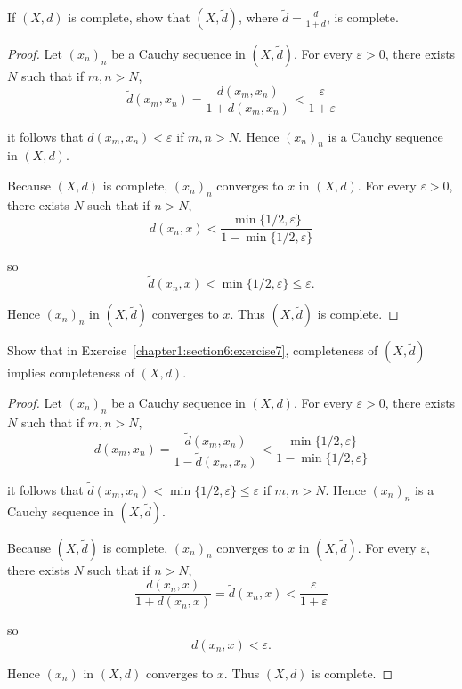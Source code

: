\begin{exercise}\label{chapter1:section6:exercise7}
    If $(X, d)$ is complete, show that $(X, \widetilde{d})$, where $\widetilde{d} = \frac{d}{1 + d}$, is complete.
\end{exercise}

\begin{proof}
    Let ${(x_{n})}_{n}$ be a Cauchy sequence in $(X, \widetilde{d})$. For every $\varepsilon > 0$, there exists $N$ such that if $m, n > N$,
    \[
        \widetilde{d}(x_{m}, x_{n}) = \frac{d(x_{m}, x_{n})}{1 + d(x_{m}, x_{n})} < \frac{\varepsilon}{1 + \varepsilon}
    \]

    it follows that $d(x_{m}, x_{n}) < \varepsilon$ if $m, n > N$. Hence ${(x_{n})}_{n}$ is a Cauchy sequence in $(X, d)$.

    Because $(X, d)$ is complete, ${(x_{n})}_{n}$ converges to $x$ in $(X, d)$. For every $\varepsilon > 0$, there exists $N$ such that if $n > N$,
    \[
        d(x_{n}, x) < \frac{\min\{1/2, \varepsilon\}}{1 - \min\{1/2, \varepsilon\}}
    \]

    so
    \[
        \widetilde{d}(x_{n}, x) < \min\{ 1/2, \varepsilon \}\leq \varepsilon.
    \]

    Hence ${(x_{n})}_{n}$ in $(X, \tilde{d})$ converges to $x$. Thus $(X, \widetilde{d})$ is complete.
\end{proof}

\begin{exercise}\label{chapter1:section6:exercise8}
    Show that in Exercise~\ref{chapter1:section6:exercise7}, completeness of $(X, \widetilde{d})$ implies completeness of $(X, d)$.
\end{exercise}

\begin{proof}
    Let ${(x_{n})}_{n}$ be a Cauchy sequence in $(X, d)$. For every $\varepsilon > 0$, there exists $N$ such that if $m, n > N$,
    \[
        d(x_{m}, x_{n}) = \frac{\widetilde{d}(x_{m}, x_{n})}{1 - \widetilde{d}(x_{m}, x_{n})} < \frac{\min\{1/2, \varepsilon\}}{1 - \min\{ 1/2, \varepsilon \}}
    \]

    it follows that $\widetilde{d}(x_{m}, x_{n}) < \min\{ 1/2, \varepsilon \} \leq\varepsilon$ if $m, n > N$. Hence ${(x_{n})}_{n}$ is a Cauchy sequence in $(X, \widetilde{d})$.

    Because $(X, \widetilde{d})$ is complete, ${(x_{n})}_{n}$ converges to $x$ in $(X, \widetilde{d})$. For every $\varepsilon$, there exists $N$ such that if $n > N$,
    \[
        \frac{d(x_{n}, x)}{1 + d(x_{n},x)} = \widetilde{d}(x_{n}, x) < \frac{\varepsilon}{1 + \varepsilon}
    \]

    so
    \[
        d(x_{n}, x) < \varepsilon.
    \]

    Hence ${(x_{n})}$ in $(X, d)$ converges to $x$. Thus $(X, d)$ is complete.
\end{proof}

